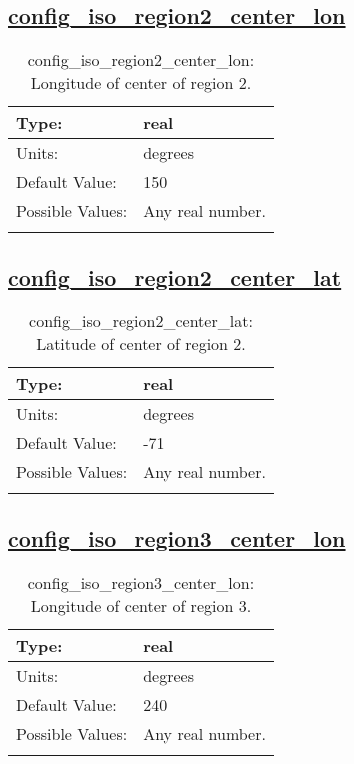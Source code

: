\subsection[config\_iso\_region2\_center\_lon]{\hyperref[sec:nm_tab_iso]{config\_iso\_region2\_center\_lon}}
\label{subsec:nm_sec_config_iso_region2_center_lon}
\begin{center}
\begin{longtable}{| p{2.0in} || p{4.0in} |}
    \hline
    Type: & real \\
    \hline
    Units: & \si{degrees} \\
    \hline
    Default Value: & 150 \\
    \hline
    Possible Values: & Any real number. \\
    \hline
    \caption{config\_iso\_region2\_center\_lon: Longitude of center of region 2.}
\end{longtable}
\end{center}
\subsection[config\_iso\_region2\_center\_lat]{\hyperref[sec:nm_tab_iso]{config\_iso\_region2\_center\_lat}}
\label{subsec:nm_sec_config_iso_region2_center_lat}
\begin{center}
\begin{longtable}{| p{2.0in} || p{4.0in} |}
    \hline
    Type: & real \\
    \hline
    Units: & \si{degrees} \\
    \hline
    Default Value: & -71 \\
    \hline
    Possible Values: & Any real number. \\
    \hline
    \caption{config\_iso\_region2\_center\_lat: Latitude of center of region 2.}
\end{longtable}
\end{center}
\subsection[config\_iso\_region3\_center\_lon]{\hyperref[sec:nm_tab_iso]{config\_iso\_region3\_center\_lon}}
\label{subsec:nm_sec_config_iso_region3_center_lon}
\begin{center}
\begin{longtable}{| p{2.0in} || p{4.0in} |}
    \hline
    Type: & real \\
    \hline
    Units: & \si{degrees} \\
    \hline
    Default Value: & 240 \\
    \hline
    Possible Values: & Any real number. \\
    \hline
    \caption{config\_iso\_region3\_center\_lon: Longitude of center of region 3.}
\end{longtable}
\end{center}
